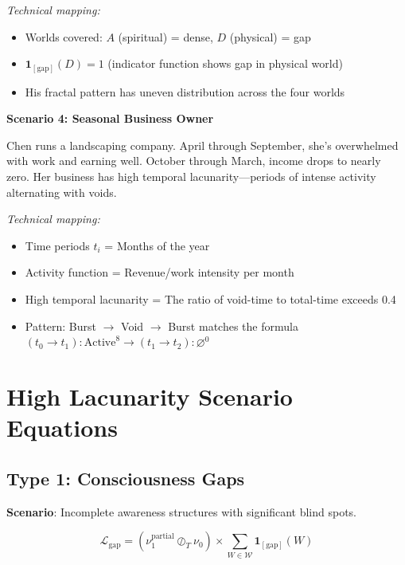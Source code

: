 \documentclass[11pt,twoside]{book}
\newcommand{\noe}[1]{\nu_{#1}}
\newcommand{\Worlds}{\mathcal{W}}
\newcommand{\Tdiv}{\oslash_T}
\begin{document}
\begin{tcolorbox}[colback=yellow!5!white,colframe=yellow!65!black,title=\textbf{Real-Life Scenarios: High Lacunarity},breakable]
\textit{Technical mapping:}
\begin{itemize}
    \item Worlds covered: $A$ (spiritual) = dense, $D$ (physical) = gap
    \item $\mathbf{1}_{[\mathrm{gap}]}(D) = 1$ (indicator function shows gap in physical world)
    \item His fractal pattern has uneven distribution across the four worlds
\end{itemize}

\textbf{Scenario 4: Seasonal Business Owner}

Chen runs a landscaping company. April through September, she's overwhelmed with work and earning well. October through March, income drops to nearly zero. Her business has high temporal lacunarity---periods of intense activity alternating with voids.

\textit{Technical mapping:}
\begin{itemize}
    \item Time periods $t_i$ = Months of the year
    \item Activity function = Revenue/work intensity per month
    \item High temporal lacunarity = The ratio of void-time to total-time exceeds 0.4
    \item Pattern: Burst $\to$ Void $\to$ Burst matches the formula $(t_0 \to t_1): \mathrm{Active}^{8} \to (t_1 \to t_2): \varnothing^{0}$
\end{itemize}

\end{tcolorbox}

\section{High Lacunarity Scenario Equations}

\subsection{Type 1: Consciousness Gaps}

\textbf{Scenario}: Incomplete awareness structures with significant blind spots.

\begin{equation}
\boxed{
    \mathcal{L}_{\mathrm{gap}} = \left( \noe{1}^{\mathrm{partial}} \Tdiv \noe{0} \right)
    \times \sum_{W \in \Worlds} \mathbf{1}_{[\mathrm{gap}]}(W)
}
\end{equation}
\end{document}
